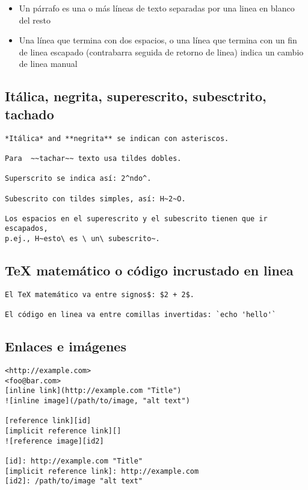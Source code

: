 \documentclass[
  12pt,
  spanish,
]{article}
\providecommand{\tightlist}{%
  \setlength{\itemsep}{0pt}\setlength{\parskip}{0pt}}
\begin{document}
\begin{itemize}
\tightlist
\item
  Un párrafo es una o más líneas de texto separadas por una linea en
  blanco del resto
\item
  Una línea que termina con dos espacios, o una línea que termina con un
  fin de linea escapado (contrabarra seguida de retorno de linea) indica
  un cambio de linea manual
\end{itemize}

\hypertarget{ituxe1lica-negrita-superescrito-subesctrito-tachado}{%
\subsection{Itálica, negrita, superescrito, subesctrito,
tachado}\label{ituxe1lica-negrita-superescrito-subesctrito-tachado}}

\begin{verbatim}
*Itálica* and **negrita** se indican con asteriscos.

Para  ~~tachar~~ texto usa tildes dobles.

Superscrito se indica así: 2^ndo^.

Subescrito con tildes simples, así: H~2~O.

Los espacios en el superescrito y el subescrito tienen que ir escapados,
p.ej., H~esto\ es \ un\ subescrito~.
\end{verbatim}

\hypertarget{tex-matemuxe1tico-o-cuxf3digo-incrustado-en-linea}{%
\subsection{TeX matemático o código incrustado en
linea}\label{tex-matemuxe1tico-o-cuxf3digo-incrustado-en-linea}}

\begin{verbatim}
El TeX matemático va entre signos$: $2 + 2$.

El código en linea va entre comillas invertidas: `echo 'hello'`
\end{verbatim}

\hypertarget{enlaces-e-imuxe1genes}{%
\subsection{Enlaces e imágenes}\label{enlaces-e-imuxe1genes}}

\begin{verbatim}
<http://example.com>
<foo@bar.com>
[inline link](http://example.com "Title")
![inline image](/path/to/image, "alt text")

[reference link][id]
[implicit reference link][]
![reference image][id2]

[id]: http://example.com "Title"
[implicit reference link]: http://example.com
[id2]: /path/to/image "alt text"
\end{verbatim}
\end{document}

